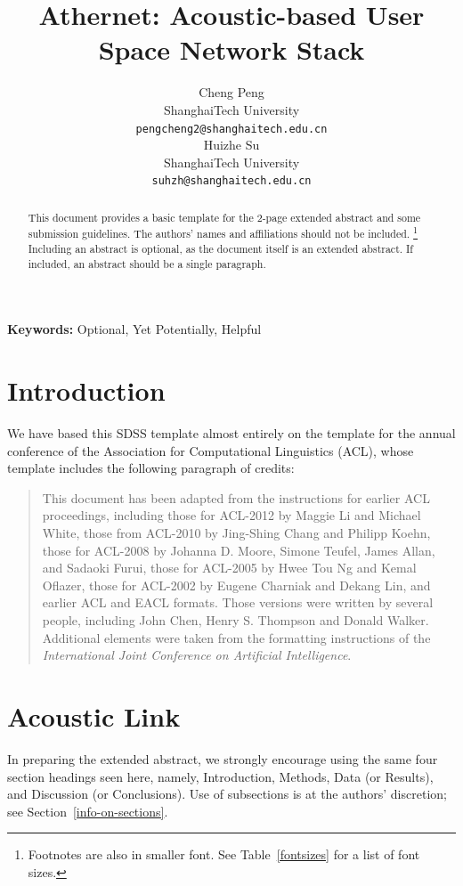 \documentclass[10pt]{article}
\title{Athernet: Acoustic-based User Space Network Stack}
\author{
  Cheng Peng \\
   ShanghaiTech University   \\
  {\tt pengcheng2@shanghaitech.edu.cn} \\\And
 Huizhe Su \\
   ShanghaiTech University  \\
  {\tt suhzh@shanghaitech.edu.cn} \\}
\date{}
\begin{document}
\maketitle
\begin{abstract}
  This document provides a basic template for the 2-page extended abstract
  and some submission guidelines. The authors' names and affiliations should not be included. \footnote{Footnotes are also in smaller font.
    See Table~\ref{fontsizes} for a list of font sizes.}
  Including an abstract is optional, as the document itself is an extended abstract.
  If included, an abstract should be a single paragraph.
\end{abstract}

{\bf Keywords:} Optional, Yet Potentially, Helpful

\section{Introduction}

We have based this SDSS template almost entirely on the template for
the annual conference of the Association for Computational Linguistics (ACL), whose
template includes the following paragraph of credits:
\begin{quotation}
  \small %
  This document has been adapted from the instructions for earlier ACL
  proceedings, including those for ACL-2012 by Maggie Li and Michael
  White, those from ACL-2010 by Jing-Shing Chang and Philipp Koehn,
  those for ACL-2008 by Johanna D. Moore, Simone Teufel, James Allan,
  and Sadaoki Furui, those for ACL-2005 by Hwee Tou Ng and Kemal
  Oflazer, those for ACL-2002 by Eugene Charniak and Dekang Lin, and
  earlier ACL and EACL formats. Those versions were written by several
  people, including John Chen, Henry S. Thompson and Donald
  Walker. Additional elements were taken from the formatting
  instructions of the {\em International Joint Conference on Artificial
      Intelligence}.
\end{quotation}

\section{Acoustic Link}

In preparing the extended abstract,
we strongly encourage using the same four section headings seen here, namely,
Introduction, Methods, Data (or Results), and Discussion (or Conclusions).
Use of subsections is at the authors' discretion; see Section~\ref{info-on-sections}.
\end{document}
